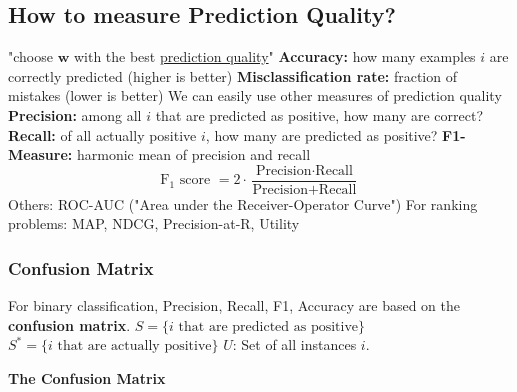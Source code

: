 \documentclass{article}
\renewcommand{\vec}[1]{%
	\mathbf{#1}%
}
\begin{document}
	\subsection{How to measure Prediction Quality?}
	\begin{outline}
		\1 "choose $\vec{w}$ with the best \underline{prediction quality}"
		\1 \textbf{Accuracy:} how many examples $i$ are correctly predicted (higher is better)
		\1 \textbf{Misclassification rate:} fraction of mistakes (lower is better)
		\1 We can easily use other measures of prediction quality
		\2 \textbf{Precision:} among all $i$ that are predicted as positive, how many are correct?
		\2 \textbf{Recall:} of all actually positive $i$, how many are predicted as positive?
		\2 \textbf{F1-Measure:} harmonic mean of precision and recall
		\begin{equation*}
			\text{F}_1\text{ score } = 2 \cdot \frac{\text{Precision}\cdot \text{Recall}}{\text{Precision} + \text{Recall}} 
		\end{equation*}
		\2 Others:
		\3 ROC-AUC ("Area under the Receiver-Operator Curve")
		\3 For ranking problems: MAP, NDCG, Precision-at-R, Utility
	\end{outline}
	\subsubsection{Confusion Matrix}
	\begin{outline}
		\1 For binary classification, Precision, Recall, F1, Accuracy are based on the \textbf{confusion matrix}.
		\2 $S = \{\text{$i$ that are predicted as positive}\}$
		\2 $S^* = \{\text{$i$ that are actually positive}\}$
		\2 $U$: Set of all instances $i$.
	\end{outline}
	{\centering \textbf{The Confusion Matrix}\par}
	\begin{table}[H]
		\centering
		\renewcommand{\arraystretch}{2}
	\end{table}
\end{document}
